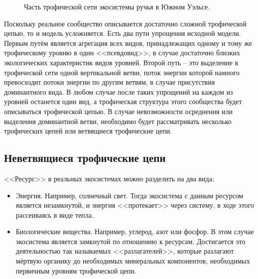 \begin{figure}[H]
        \caption{Часть трофической сети экосистемы ручья в Южном Уэльсе.} \label{small_river_graph}
    \end{figure}

    Поскольку реальное сообщество описывается достаточно сложной трофической цепью, то и модель усложняется. Есть два пути упрощения исходной модели. Первым путём является агрегация всех видов, принадлежащих одному и тому же трофическому уровню в один <<псевдовид>>, в случае достаточно близких экологических характеристик видов уровней. Второй путь -- это выделение в трофической сети одной вертикальной ветви, поток энергии которой намного превосходит потоки энергии по другим ветвям, в случае присутствия доминантного вида. В любом случае после таких упрощений на каждом из уровней останется один вид, а трофическая структура этого сообщества будет описываться трофической цепью. В случае невозможности осреднения или выделения доминантной ветви, необходимо будет рассматривать несколько трофических цепей или ветвящиеся трофические цепи.

\subsection{Неветвящиеся трофические цепи}
<<Ресурс>> в реальных экосистемах можно разделить на два вида:
\begin{itemize}
    \item Энергия. Например, солнечный свет. Тогда экосистема с данным ресурсом является незамкнутой, и энергия <<протекает>> через систему, в ходе этого рассеиваясь в виде тепла.
    \item Биологические вещества. Например, углерод, азот или фосфор. В этом случае экосистема является замкнутой по отношению к ресурсам. Достигается это деятельностью так называемых <<разлагателей>>, которые разлагают мёртвую органику до необходимых минеральных компонентов, необходимых первичным уровням трофической цепи.
\end{itemize}

